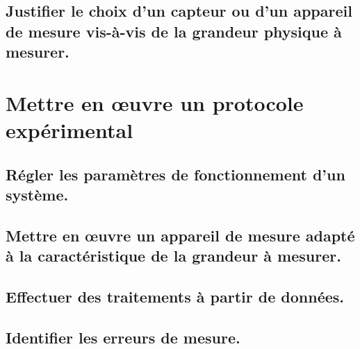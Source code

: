 \documentclass[10pt,fleqn]{article}
\begin{document}
\subsection{Justifier le choix d’un capteur ou d’un appareil de mesure vis-à-vis de la grandeur physique à mesurer.} 

\begin{multicols}{2} 

\end{multicols}

\section{Mettre en œuvre un protocole expérimental} 

\subsection{Régler les paramètres de fonctionnement d'un système.} 

\begin{multicols}{2} 

\end{multicols}

\subsection{Mettre en œuvre un appareil de mesure adapté à la caractéristique de la grandeur à mesurer.} 

\begin{multicols}{2} 

\end{multicols}

\subsection{Effectuer des traitements à partir de données. } 

\begin{multicols}{2} 

\end{multicols}

\subsection{Identifier les erreurs de mesure.} 

\begin{multicols}{2} 

\end{multicols}
\end{document}
